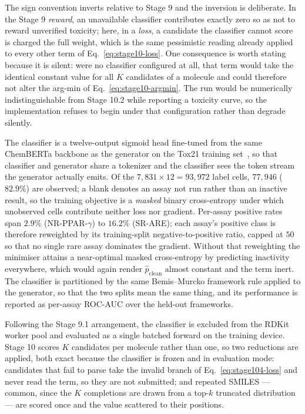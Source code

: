 The sign convention inverts relative to Stage 9 and the inversion is
deliberate. In the Stage 9 \emph{reward}, an unavailable classifier
contributes exactly zero so as not to reward unverified toxicity; here, in a
\emph{loss}, a candidate the classifier cannot score is charged the full
weight, which is the same pessimistic reading already applied to every other
term of Eq.~\eqref{eq:stage10-loss}. One consequence is worth stating because
it is silent: were no classifier configured at all, that term would take the
identical constant value for all $K$ candidates of a molecule and could
therefore not alter the arg-min of Eq.~\eqref{eq:stage10-argmin}. The run
would be numerically indistinguishable from Stage 10.2 while reporting a
toxicity curve, so the implementation refuses to begin under that
configuration rather than degrade silently.

The classifier is a twelve-output sigmoid head fine-tuned from the same
ChemBERTa backbone as the generator on the Tox21 training
set~\cite{huang2016tox21,tox21challenge}, so that classifier and generator
share a tokenizer and the classifier sees the token stream the generator
actually emits. Of the $7{,}831 \times 12 = 93{,}972$ label cells, $77{,}946$
($82.9\%$) are observed; a blank denotes an assay not run rather than an
inactive result, so the training objective is a \emph{masked} binary
cross-entropy under which unobserved cells contribute neither loss nor
gradient. Per-assay positive rates span $2.9\%$ (NR-PPAR-$\gamma$) to
$16.2\%$ (SR-ARE); each assay's positive class is therefore reweighted by its
training-split negative-to-positive ratio, capped at $50$ so that no single
rare assay dominates the gradient. Without that reweighting the minimiser
attains a near-optimal masked cross-entropy by predicting inactivity
everywhere, which would again render $\hat{p}_{\mathrm{clean}}$ almost
constant and the term inert. The classifier is partitioned by the same
Bemis--Murcko framework rule applied to the generator, so that the two splits
mean the same thing, and its performance is reported as per-assay ROC-AUC over
the held-out frameworks.

Following the Stage 9.1 arrangement, the classifier is excluded from the RDKit
worker pool and evaluated as a single batched forward on the training device.
Stage 10 scores $K$ candidates per molecule rather than one, so two reductions
are applied, both exact because the classifier is frozen and in evaluation
mode: candidates that fail to parse take the invalid branch of
Eq.~\eqref{eq:stage104-loss} and never read the term, so they are not
submitted; and repeated SMILES --- common, since the $K$ completions are drawn
from a top-$k$ truncated distribution --- are scored once and the value
scattered to their positions.

